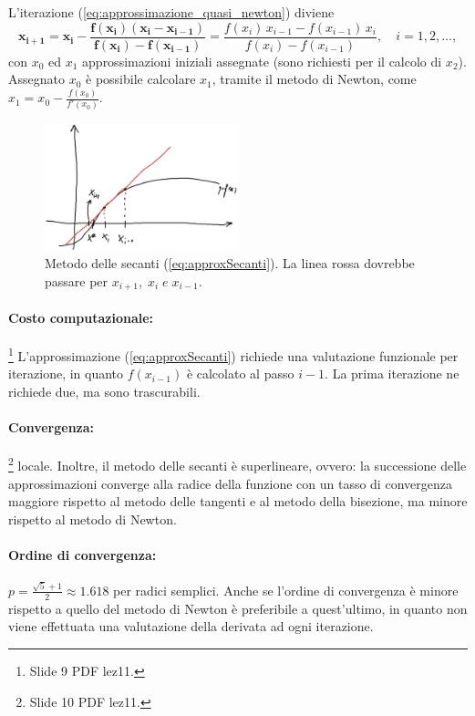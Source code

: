 L'iterazione (\ref{eq:approssimazione_quasi_newton}) diviene
\begin{equation}\label{eq:approxSecanti}
	\boldsymbol{x_{i+1}=x_i-\frac{f(x_i)(x_i-x_{i-1})}{f(x_i)-f(x_{i-1})}}=\frac{f(x_i)\,x_{i-1} - f(x_{i-1})\,x_i}{f(x_i)-f(x_{i-1})}, \quad i=1,2,\hdots,
\end{equation}
con $x_0$ ed $x_1$ approssimazioni iniziali assegnate (sono richiesti per il calcolo di $x_2$). Assegnato $x_0$ è possibile calcolare $x_1$, tramite il metodo di Newton, come $x_1=x_0-\frac{f(x_0)}{f'(x_0)}$.

\begin{figure}
	\centering
	\includegraphics[width=0.5\textwidth]{immagini/GraficoSecanti.png}
	\caption{\label{fig:GraficoSecanti} Metodo delle secanti (\ref{eq:approxSecanti}). La linea rossa dovrebbe passare per $x_{i+1},\; x_i\; e\; x_{i-1}$.}
\end{figure}

\paragraph{Costo computazionale:}\footnote{Slide 9 PDF lez11.}
L'approssimazione (\ref{eq:approxSecanti}) richiede una valutazione funzionale per iterazione, in quanto $f(x_{i-1})$ è calcolato al passo $i-1$. La prima iterazione ne richiede due, ma sono trascurabili.

\paragraph{Convergenza:}\footnote{Slide 10 PDF lez11.} locale. Inoltre, il metodo delle secanti è superlineare, ovvero: la successione delle approssimazioni converge alla radice della funzione con un tasso di convergenza maggiore rispetto al metodo delle tangenti e al metodo della bisezione, ma minore rispetto al metodo di Newton.

\paragraph{Ordine di convergenza:} $p = \frac{\sqrt{5}+1}{2}\approx 1.618$ per radici semplici. Anche se l'ordine di convergenza è minore rispetto a quello del metodo di Newton è preferibile a quest'ultimo, in quanto non viene effettuata una valutazione della derivata ad ogni iterazione.

